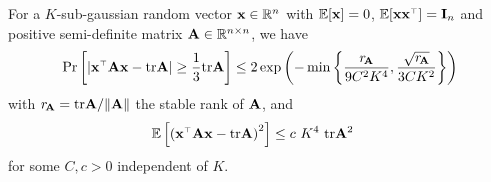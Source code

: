 \documentclass[../../thesis.tex]{subfiles}
\begin{document}

%
%
%
\begin{lemma}
  \label{l:concentration-sub-gaussian}
  For a $K$-sub-gaussian random vector $\mathbf x \in \mathbb R^n$ with $\mathbb E[\mathbf x] = 0$, $\E[\x \x^\top] = \I_n$ and positive semi-definite matrix $\mathbf A \in \mathbb R^{n \times n}$, we have
  \[
    \Pr\left[
      \lvert \x^\top \A \x - \tr \A \rvert
      \geq \frac13 \tr \A
      \right] \leq 2 \exp\left( - \min \left\{ \frac{r_{\!\A}}{9 C^2 K^4}, \frac{\sqrt{r_{\!\A}}}{3 C K^2}  \right\} \right)
  \]
  with $r_{\!\mathbf A} = \mathrm{tr} \mathbf A/\| \mathbf A \|$ the stable rank of $\mathbf A$, and
  \begin{align*}
    \E\left[ \left( \x^\top \A \x - \tr \A \right)^2 \right]
     & \leq c~K^4~\tr \A^2
  \end{align*}
  for some $C,c > 0$ independent of $K$.
\end{lemma}
\end{document}
